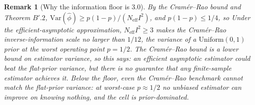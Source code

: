 \documentclass[11pt,a4paper]{article}
\newtheorem{remark}{Remark}
\begin{document}
\begin{remark}[Why the information floor is $3.0$]
By the Cram\'er--Rao bound and Theorem $B'.2$, $\mathrm{Var}(\hat{\phi}) \ge p(1-p) / (N_{\mathrm{eff}} I^2)$, and $p(1-p) \le 1/4$, so Under the efficient-asymptotic approximation, $N_{\mathrm{eff}} I^2 \ge 3$ makes the Cram\'er--Rao inverse-information scale no larger than $1/12$, the variance of a $\mathrm{Uniform}(0,1)$ prior at the worst operating point $p = 1/2$. The Cram\'er--Rao bound is a \emph{lower} bound on estimator variance, so this says: an efficient asymptotic estimator \emph{could} beat the flat-prior variance, but there is no guarantee that any finite-sample estimator achieves it. Below the floor, even the Cram\'er--Rao benchmark cannot match the flat-prior variance: at worst-case $p \approx 1/2$ no unbiased estimator can improve on knowing nothing, and the cell is prior-dominated. %
\end{remark}
\end{document}
